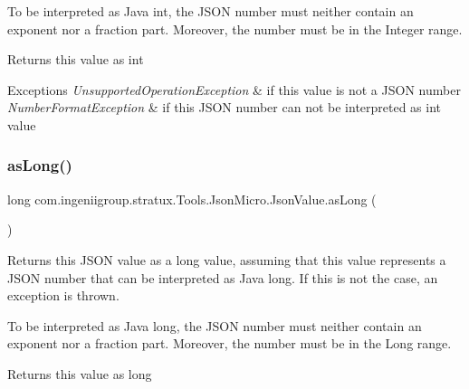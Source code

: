 To be interpreted as Java {\ttfamily int}, the J\+S\+ON number must neither contain an exponent nor a fraction part. Moreover, the number must be in the {\ttfamily Integer} range. 

\begin{DoxyReturn}{Returns}
this value as {\ttfamily int} 
\end{DoxyReturn}

\begin{DoxyExceptions}{Exceptions}
{\em Unsupported\+Operation\+Exception} & if this value is not a J\+S\+ON number \\
\hline
{\em Number\+Format\+Exception} & if this J\+S\+ON number can not be interpreted as {\ttfamily int} value \\
\hline
\end{DoxyExceptions}
\mbox{\label{classcom_1_1ingeniigroup_1_1stratux_1_1_tools_1_1_json_micro_1_1_json_value_a2239597c6128e977fcce37428ff4f7da}} 
\subsubsection{\texorpdfstring{as\+Long()}{asLong()}}
{\footnotesize\ttfamily long com.\+ingeniigroup.\+stratux.\+Tools.\+Json\+Micro.\+Json\+Value.\+as\+Long (\begin{DoxyParamCaption}{ }\end{DoxyParamCaption})}

Returns this J\+S\+ON value as a {\ttfamily long} value, assuming that this value represents a J\+S\+ON number that can be interpreted as Java {\ttfamily long}. If this is not the case, an exception is thrown. 

To be interpreted as Java {\ttfamily long}, the J\+S\+ON number must neither contain an exponent nor a fraction part. Moreover, the number must be in the {\ttfamily Long} range. 

\begin{DoxyReturn}{Returns}
this value as {\ttfamily long} 
\end{DoxyReturn}

